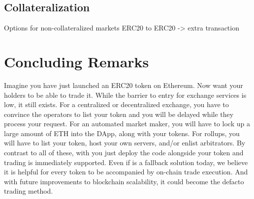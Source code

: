 \subsection{Collateralization}

Options for non-collateralized markets
ERC20 to ERC20 -> extra transaction





\section{Concluding Remarks} 

Imagine you have just launched an ERC20 token on Ethereum. Now want your holders to be able to trade it. While the barrier to entry for exchange services is low, it still exists. For a centralized or decentralized exchange, you have to convince the operators to list your token and you will be delayed while they process your request. For an automated market maker, you will have to lock up a large amount of ETH into the DApp, along with your tokens. For rollups, you will have to list your token, host your own servers, and/or enlist arbitrators. By contrast to all of these, with \cm you just deploy the code alongside your token and trading is immediately supported. Even if \cm is a fallback solution today, we believe it is helpful for every token to be accompanied by on-chain trade execution. And with future improvements to blockchain scalability, it could become the defacto trading method.
 































